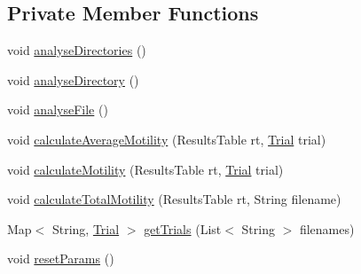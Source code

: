 \subsection*{Private Member Functions}
\begin{DoxyCompactItemize}
\item 
void \hyperlink{classanalysis_1_1_motility_ab3d086d15d667db78ea6785d8fc90223}{analyse\+Directories} ()
\item 
void \hyperlink{classanalysis_1_1_motility_ad8447fb7554f7f126822c7a3f3f680ce}{analyse\+Directory} ()
\item 
void \hyperlink{classanalysis_1_1_motility_a0b1464e818c4300782cb7e3322448f95}{analyse\+File} ()
\item 
void \hyperlink{classanalysis_1_1_motility_afa983ea070fe9739c16c819bd180dac9}{calculate\+Average\+Motility} (Results\+Table rt, \hyperlink{classdata_1_1_trial}{Trial} trial)
\item 
void \hyperlink{classanalysis_1_1_motility_a02cd8027747b70728a837c58fdf75cb4}{calculate\+Motility} (Results\+Table rt, \hyperlink{classdata_1_1_trial}{Trial} trial)
\item 
void \hyperlink{classanalysis_1_1_motility_a6416a16af8e55569f37168bb76fe7174}{calculate\+Total\+Motility} (Results\+Table rt, String filename)
\item 
Map$<$ String, \hyperlink{classdata_1_1_trial}{Trial} $>$ \hyperlink{classanalysis_1_1_motility_a5580224f7f7e9df7d925ad14f9364d98}{get\+Trials} (List$<$ String $>$ filenames)
\item 
void \hyperlink{classanalysis_1_1_motility_a20915c32899c4bbe4d08e483bd5eb09c}{reset\+Params} ()
\end{DoxyCompactItemize}
